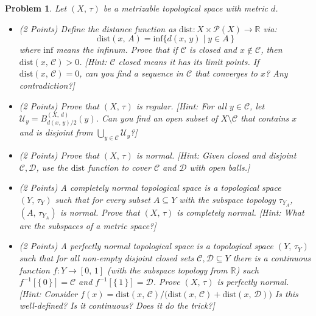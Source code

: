 \documentclass{article}
\theoremstyle{normal}
\newtheorem{problem}{Problem}
\begin{document}
    \begin{problem}
        Let $(X,\,\tau)$ be a metrizable topological space with metric $d$.
        \begin{itemize}
            \item (2 Points)
                Define the distance function as
                $\textrm{dist}:X\times\mathcal{P}(X)\rightarrow\mathbb{R}$ via:
                \begin{equation}
                    \textrm{dist}(x,\,A)=
                    \textrm{inf}\big\{d(x,\,y)\;|\;y\in{A}\,\big\}
                \end{equation}
                where $\textrm{inf}$ means the \textit{infinum}. Prove that if
                $\mathcal{C}$ is closed and $x\notin\mathcal{C}$, then
                $\textrm{dist}(x,\,\mathcal{C})>0$. [Hint: $\mathcal{C}$ closed
                means it has its limit points. If
                $\textrm{dist}(x,\,\mathcal{C})=0$, can you find a sequence
                in $\mathcal{C}$ that converges to $x$? Any contradiction?]
            \item (2 Points) Prove that $(X,\,\tau)$ is regular.
                [Hint: For all $y\in\mathcal{C}$, let
                $\mathcal{U}_{y}=B_{d(x,\,y)/2}^{(X,\,d)}(y)$. Can you find
                an open subset of $X\setminus\mathcal{C}$ that contains
                $x$ and is disjoint from
                $\bigcup_{y\in\mathcal{C}}\mathcal{U}_{y}$?] 
            \item (2 Points)
                Prove that $(X,\,\tau)$ is normal. [Hint: Given closed and
                disjoint $\mathcal{C},\mathcal{D}$, use the $\textrm{dist}$
                function to cover $\mathcal{C}$ and $\mathcal{D}$ with open
                balls.]
            \item (2 Points)
                A completely normal topological space is a topological space
                $(Y,\,\tau_{Y})$ such that for every subset $A\subseteq{Y}$ with
                the subspace topology $\tau_{Y_{A}}$, $(A,\,\tau_{Y_{A}})$ is
                normal. Prove that $(X,\,\tau)$ is completely normal.
                [Hint: What are the subspaces of a metric space?]
            \item (2 Points)
                A perfectly normal topological space is a topological space
                $(Y,\,\tau_{Y})$ such that for all non-empty disjoint closed
                sets $\mathcal{C},\mathcal{D}\subseteq{Y}$ there is a continuous
                function $f:Y\rightarrow[0,\,1]$ (with the subspace topology
                from $\mathbb{R}$) such $f^{-1}[\{\,0\,\}]=\mathcal{C}$ and
                $f^{-1}[\{\,1\,\}]=\mathcal{D}$. Prove $(X,\,\tau)$ is
                perfectly normal. [Hint: Consider
                $f(x)=\textrm{dist}(x,\,\mathcal{C})/\big(\textrm{dist}(x,\,\mathcal{C})+\textrm{dist}(x,\,\mathcal{D})\big)$
                Is this well-defined? Is it continuous? Does it do the trick?]
        \end{itemize}
    \end{problem}
\end{document}

